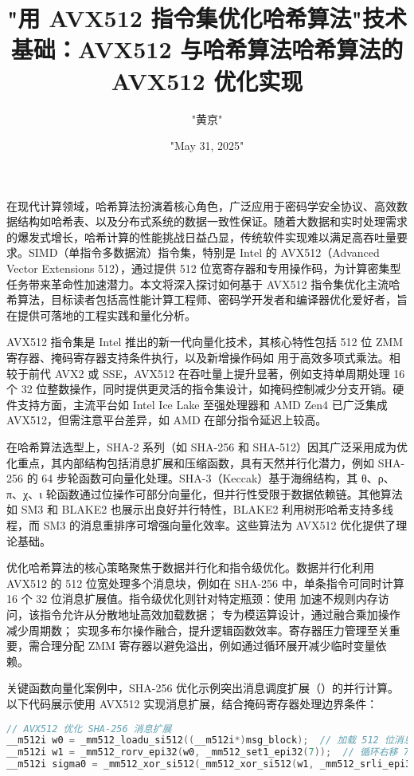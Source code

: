 \title{"用 AVX512 指令集优化哈希算法"}
\author{"黄京"}
\date{"May 31, 2025"}
\maketitle
在现代计算领域，哈希算法扮演着核心角色，广泛应用于密码学安全协议、高效数据结构如哈希表、以及分布式系统的数据一致性保证。随着大数据和实时处理需求的爆发式增长，哈希计算的性能挑战日益凸显，传统软件实现难以满足高吞吐量要求。SIMD（单指令多数据流）指令集，特别是 Intel 的 AVX512（Advanced Vector Extensions 512），通过提供 512 位宽寄存器和专用操作码，为计算密集型任务带来革命性加速潜力。本文将深入探讨如何基于 AVX512 指令集优化主流哈希算法，目标读者包括高性能计算工程师、密码学开发者和编译器优化爱好者，旨在提供可落地的工程实践和量化分析。\par
\title{技术基础：AVX512 与哈希算法}
AVX512 指令集是 Intel 推出的新一代向量化技术，其核心特性包括 512 位 ZMM 寄存器、掩码寄存器支持条件执行，以及新增操作码如  用于高效多项式乘法。相较于前代 AVX2 或 SSE，AVX512 在吞吐量上提升显著，例如支持单周期处理 16 个 32 位整数操作，同时提供更灵活的指令集设计，如掩码控制减少分支开销。硬件支持方面，主流平台如 Intel Ice Lake 至强处理器和 AMD Zen4 已广泛集成 AVX512，但需注意平台差异，如 AMD 在部分指令延迟上较高。\par
在哈希算法选型上，SHA-2 系列（如 SHA-256 和 SHA-512）因其广泛采用成为优化重点，其内部结构包括消息扩展和压缩函数，具有天然并行化潜力，例如 SHA-256 的 64 步轮函数可向量化处理。SHA-3（Keccak）基于海绵结构，其 θ、ρ、π、χ、ι 轮函数通过位操作可部分向量化，但并行性受限于数据依赖链。其他算法如 SM3 和 BLAKE2 也展示出良好并行特性，BLAKE2 利用树形哈希支持多线程，而 SM3 的消息重排序可增强向量化效率。这些算法为 AVX512 优化提供了理论基础。\par
\title{哈希算法的 AVX512 优化实现}
优化哈希算法的核心策略聚焦于数据并行化和指令级优化。数据并行化利用 AVX512 的 512 位宽处理多个消息块，例如在 SHA-256 中，单条指令可同时计算 16 个 32 位消息扩展值。指令级优化则针对特定瓶颈：使用  加速不规则内存访问，该指令允许从分散地址高效加载数据； 专为模运算设计，通过融合乘加操作减少周期数； 实现多布尔操作融合，提升逻辑函数效率。寄存器压力管理至关重要，需合理分配 ZMM 寄存器以避免溢出，例如通过循环展开减少临时变量依赖。\par
关键函数向量化案例中，SHA-256 优化示例突出消息调度扩展（）的并行计算。以下代码展示使用 AVX512 实现消息扩展，结合掩码寄存器处理边界条件：\par
\begin{lstlisting}[language=c]
// AVX512 优化 SHA-256 消息扩展
__m512i w0 = _mm512_loadu_si512((__m512i*)msg_block);  // 加载 512 位消息块
__m512i w1 = _mm512_rorv_epi32(w0, _mm512_set1_epi32(7));  // 循环右移 7 位
__m512i sigma0 = _mm512_xor_si512(_mm512_xor_si512(w1, _mm512_srli_epi32(w0, 3)), _mm512_slli_epi32(w0, 14));  // σ 0 函数计算
\end{lstlisting}
